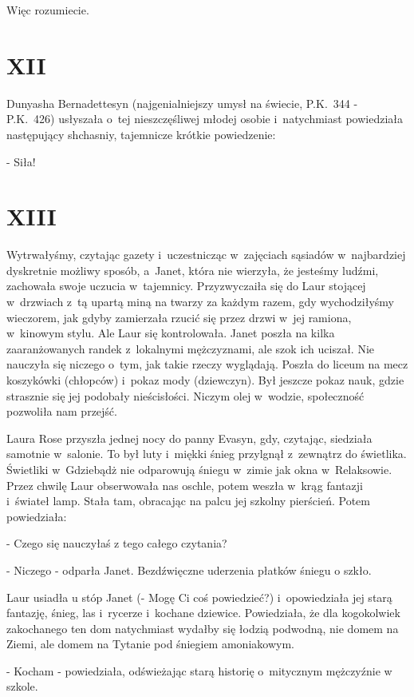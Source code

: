 \documentclass[oneside,polish,12pt,sfheadings]{mwbk}
\begin{document}
Więc rozumiecie.

\chapter{XII}

Dunyasha Bernadettesyn (najgenialniejszy umysł na świecie, P.K.~344 -
P.K.~426) usłyszała o~tej nieszczęśliwej młodej osobie i~natychmiast
powiedziała następujący shchasniy, tajemnicze krótkie powiedzenie:

- Siła!

\chapter{XIII}

Wytrwałyśmy, czytając gazety i~uczestnicząc w~zajęciach sąsiadów w~najbardziej dyskretnie możliwy sposób, a~Janet, która nie wierzyła,
że jesteśmy ludźmi, zachowała swoje uczucia w~tajemnicy. Przyzwyczaiła
się do Laur stojącej w~drzwiach z~tą upartą miną na twarzy za każdym
razem, gdy wychodziłyśmy wieczorem, jak gdyby zamierzała rzucić się
przez drzwi w~jej ramiona, w~kinowym stylu. Ale Laur się kontrolowała.
Janet poszła na kilka zaaranżowanych randek z~lokalnymi mężczyznami,
ale szok ich uciszał. Nie nauczyła się niczego o~tym, jak takie rzeczy
wyglądają. Poszła do liceum na mecz koszykówki (chłopców) i~pokaz
mody (dziewczyn). Był jeszcze pokaz nauk, gdzie strasznie się jej
podobały nieścisłości. Niczym olej w~wodzie, społeczność pozwoliła
nam przejść.

Laura Rose przyszła jednej nocy do panny Evasyn, gdy, czytając, siedziała
samotnie w~salonie. To był luty i~miękki śnieg przylgnął z~zewnątrz
do świetlika. Świetliki w~Gdziebądż nie odparowują śniegu w~zimie
jak okna w~Relaksowie. Przez chwilę Laur obserwowała nas oschle, potem
weszła w~krąg fantazji i~świateł lamp. Stała tam, obracając na palcu
jej szkolny pierścień. Potem powiedziała: 

- Czego się nauczyłaś z
tego całego czytania?

- Niczego - odparła Janet. Bezdźwięczne uderzenia płatków śniegu o
szkło.

Laur usiadła u stóp Janet (- Mogę Ci coś powiedzieć?) i~opowiedziała
jej starą fantazję, śnieg, las i~rycerze i~kochane dziewice. Powiedziała,
że dla kogokolwiek zakochanego ten dom natychmiast wydałby się łodzią
podwodną, nie domem na Ziemi, ale domem na Tytanie pod śniegiem amoniakowym.

- Kocham - powiedziała, odświeżając starą historię o~mitycznym mężczyźnie
w szkole.
\end{document}
